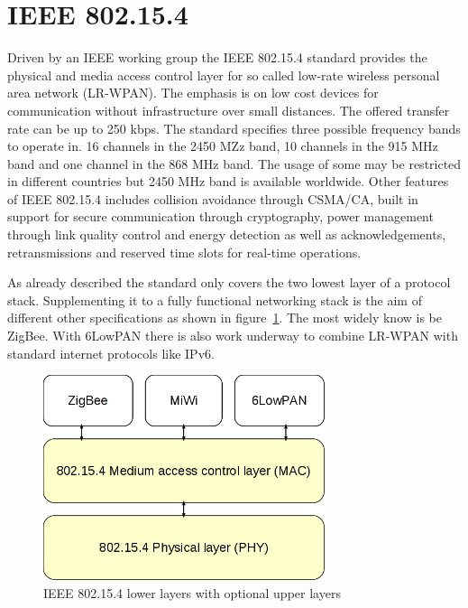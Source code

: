 \section{IEEE 802.15.4}
\label{intro802154}
Driven by an IEEE working group the IEEE 802.15.4 standard provides the physical and
media access control layer for so called low-rate wireless personal area network
(LR-WPAN). The emphasis is on low cost devices for communication without
infrastructure over small distances. The offered transfer rate can be up to 250 kbps.
The standard specifies three possible frequency bands to operate in. 16 channels
in the 2450 MZz band, 10 channels in the 915 MHz band and one channel in the 868
MHz band. The usage of some may be restricted in different countries but 2450 MHz
band is available worldwide.
Other features of IEEE 802.15.4 includes collision avoidance through CSMA/CA, built
in support for secure communication through cryptography, power management through
link quality control and energy detection as well as acknowledgements,
retransmissions and reserved time slots for real-time operations.

As already described the standard only covers the two lowest layer of a
protocol stack. Supplementing it to a fully functional networking stack is the aim
of different other specifications as shown in figure~\ref{fig:802154layer}. The
most widely know is be ZigBee. With 6LowPAN there is also work underway to combine
LR-WPAN with standard internet protocols like IPv6.

\begin{figure}
  \begin{center}
    \includegraphics[height=6cm]{images/802154layer}
    \caption{IEEE 802.15.4 lower layers with optional upper layers}
        \label{fig:802154layer}
  \end{center}
\end{figure}

